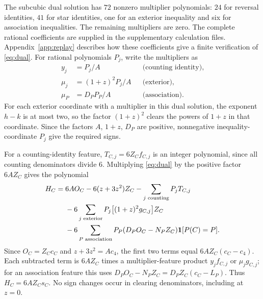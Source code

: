 \documentclass[11pt]{article}
\newcommand{\ind}{\mathbf1}\newcommand{\F}{\mathcal F}\newcommand{\V}{\mathcal V}
\begin{document}
The subcubic dual solution has $72$ nonzero multiplier polynomials: $24$ for reversal identities, $41$ for star identities, one for an exterior inequality and six for association inequalities. The remaining multipliers are zero. The complete rational coefficients are supplied in the supplementary calculation files. Appendix~\ref{app:replay} describes how these coefficients give a finite verification of \eqref{eq:dual}.
 For rational polynomials $P_j$, write the multipliers as
\begin{align*}
 y_j&=P_j/A &&\text{(counting identity)},\\
 \mu_j&=(1+z)^2P_j/A &&\text{(exterior)},\\
 \mu_P&=D_PP_P/A &&\text{(association)}.
\end{align*}
For each exterior coordinate with a multiplier in this dual solution, the exponent $h-k$ is at most two, so the factor $(1+z)^2$ clears the powers of $1+z$ in that coordinate. Since the factors $A$, $1+z$, $D_P$ are positive, nonnegative inequality-coordinate $P_j$ give the required signs.

For a counting-identity feature, $T_{C,j}=6Z_Cf_{C,j}$ is an integer polynomial, since all counting denominators divide $6$. Multiplying \eqref{eq:dual} by the positive factor $6A Z_C$ gives the polynomial
\begin{align}
 H_C={}&6A O_C-6(z+3z^2)Z_C-\sum_{j\text{ counting}}P_jT_{C,j}\notag\\
 &-6\sum_{j\text{ exterior}}P_j\bigl[(1+z)^2g_{C,j}\bigr]Z_C\notag\\
 &-6\sum_{P\text{ association}}P_P(D_PO_C-N_PZ_C)\ind[P(C)=P].\label{eq:cleared}
\end{align}
Since $O_C=Z_Cc_C$ and $z+3z^2=Ac_4$, the first two terms equal $6AZ_C(c_C-c_4)$. Each subtracted term is $6AZ_C$ times a multiplier-feature product $y_jf_{C,j}$ or $\mu_jg_{C,j}$; for an association feature this uses $D_PO_C-N_PZ_C=D_PZ_C(c_C-L_P)$. Thus $H_C=6AZ_Cs_C$. No sign changes occur in clearing denominators, including at $z=0$.
\end{document}

